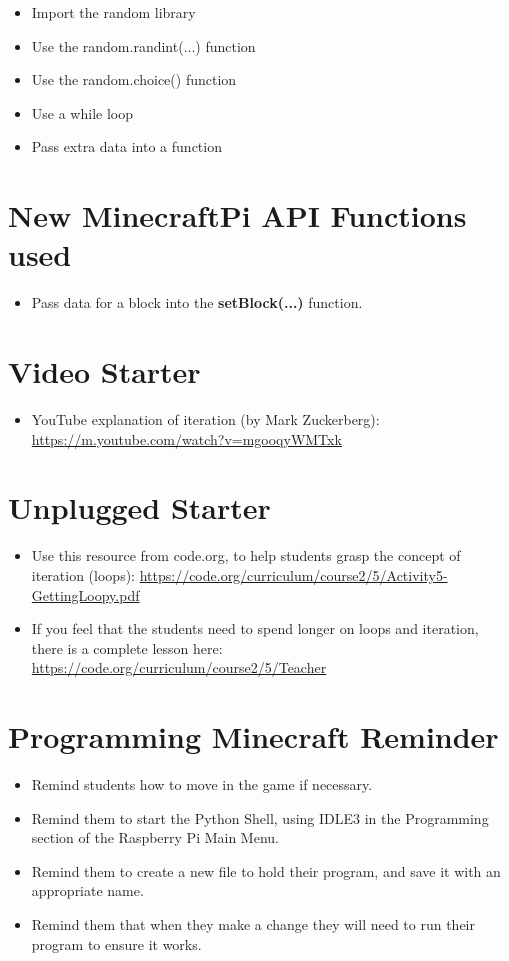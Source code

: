 \documentclass{geocraft-lesson-plan}
\begin{document}
\begin{itemize}
\item Import the random library
\item Use the random.randint(...) function
\item Use the random.choice() function
\item Use a while loop
\item Pass extra data into a function
\end{itemize}

\section*{New MinecraftPi API Functions used}

\begin{itemize}
\item Pass data for a block into the \textbf{setBlock(...)} function.
\end{itemize}

\section*{Video Starter}
\begin{itemize}
\item YouTube explanation of iteration (by Mark Zuckerberg): 
  {\textcolor{greenish}
    {\url{https://m.youtube.com/watch?v=mgooqyWMTxk}}}
\end{itemize}


\section*{Unplugged Starter}
\begin{itemize}
\item Use this resource from code.org, to help students grasp the concept of iteration (loops): 
  {\textcolor{greenish}
    {\url{https://code.org/curriculum/course2/5/Activity5-GettingLoopy.pdf}}}
\item If you feel that the students need to spend longer on loops and iteration, there is a complete lesson here:  
  {\textcolor{greenish}
    {\url{https://code.org/curriculum/course2/5/Teacher}}}
\end{itemize}

\section*{Programming Minecraft Reminder}
\begin{itemize}
\item Remind students how to move in the game if necessary.
\item Remind them to start the Python Shell, using IDLE3 in the Programming section of the Raspberry Pi Main Menu.
\item Remind them to create a new file to hold their program, and save it with an appropriate name.  
\item Remind them that when they make a change they will need to run their program to ensure it works.
\end{itemize}
\end{document}
